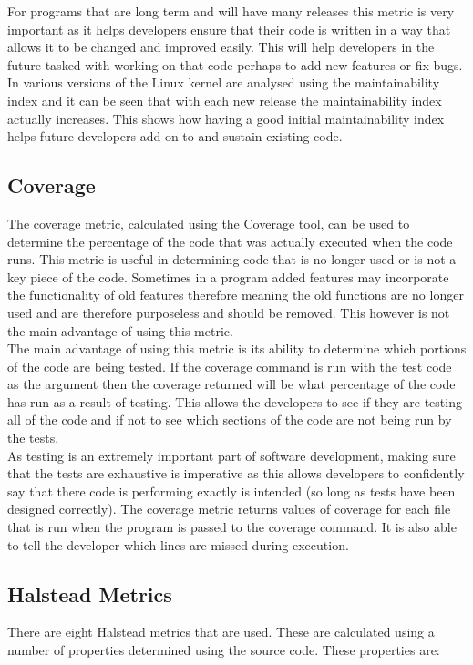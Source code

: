 \documentclass[11pt,journal, a4paper]{IEEEtran}
\begin{document}
\noindent
For programs that are long term and will have many releases this metric is very important as it helps developers ensure that their code is written in a way that allows it to be changed and improved easily. This will help developers in the future tasked with working on that code perhaps to add new features or fix bugs. In \cite{Linux} various versions of the Linux kernel are analysed using the maintainability index and it can be seen that with each new release the maintainability index actually increases. This shows how having a good initial maintainability index helps future developers add on to and sustain existing code.


\subsection{Coverage}
\noindent 
The coverage metric, calculated using the Coverage tool, can be used to determine the percentage of the code that was actually executed when the code runs. This metric is useful in determining code that is no longer used or is not a key piece of the code. Sometimes in a program added features may incorporate the functionality of old features therefore meaning the old functions are no longer used and are therefore purposeless and should be removed. This however is not the main advantage of using this metric.\\

\noindent
The main advantage of using this metric is its ability to determine which portions of the code are being tested. If the coverage command is run with the test code as the argument then the coverage returned will be what percentage of the code has run as a result of testing. This allows the developers to see if they are testing all of the code and if not to see which sections of the code are not being run by the tests. \\

\noindent
As testing is an extremely important part of software development, making sure that the tests are exhaustive is imperative as this allows developers to confidently say that there code is performing exactly is intended (so long as tests have been designed correctly). The coverage metric returns values of coverage for each file that is run when the program is passed to the coverage command. It is also able to tell the developer which lines are missed during execution. 



\subsection{Halstead Metrics}
\noindent
There are eight Halstead metrics that are used. These are calculated using a number of properties determined using the source code. These properties are:
\end{document}
